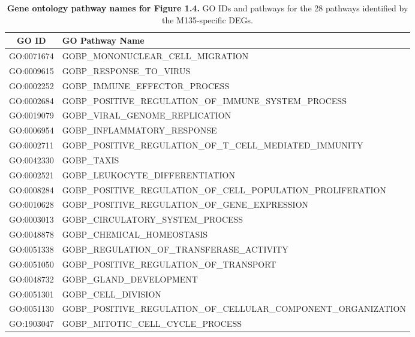 \clearpage
\begin{table}[t]
    \centering
    \caption[Gene ontology pathway names for Figure 1.4.]{\textbf{Gene ontology pathway names for Figure 1.4.} GO IDs and pathways for the 28 pathways identified by the M135-specific DEGs.}
    \begin{tabular}{|c|m{13cm}|}
    \hline
        GO ID & GO Pathway Name \\ 
        \hline
        GO:0071674 & GOBP\_MONONUCLEAR\_CELL\_MIGRATION \\ 
        \hline
        GO:0009615 & GOBP\_RESPONSE\_TO\_VIRUS \\ \hline
        GO:0002252 & GOBP\_IMMUNE\_EFFECTOR\_PROCESS \\ \hline
        GO:0002684 & GOBP\_POSITIVE\_REGULATION\_OF\_IMMUNE\_SYSTEM\_PROCESS \\ \hline
        GO:0019079 & GOBP\_VIRAL\_GENOME\_REPLICATION \\ \hline
        GO:0006954 & GOBP\_INFLAMMATORY\_RESPONSE \\ \hline
        GO:0002711 & GOBP\_POSITIVE\_REGULATION\_OF\_T\_CELL\_MEDIATED\_IMMUNITY \\ \hline
        GO:0042330 & GOBP\_TAXIS \\ \hline
        GO:0002521 & GOBP\_LEUKOCYTE\_DIFFERENTIATION \\ \hline
        GO:0008284 & GOBP\_POSITIVE\_REGULATION\_OF\_CELL\_\newline POPULATION\_PROLIFERATION \\ \hline
        GO:0010628 & GOBP\_POSITIVE\_REGULATION\_OF\_GENE\_EXPRESSION \\ \hline
        GO:0003013 & GOBP\_CIRCULATORY\_SYSTEM\_PROCESS \\ \hline
        GO:0048878 & GOBP\_CHEMICAL\_HOMEOSTASIS \\ \hline
        GO:0051338 & GOBP\_REGULATION\_OF\_TRANSFERASE\_ACTIVITY \\ \hline
        GO:0051050 & GOBP\_POSITIVE\_REGULATION\_OF\_TRANSPORT \\ \hline
        GO:0048732 & GOBP\_GLAND\_DEVELOPMENT \\ \hline
        GO:0051301 & GOBP\_CELL\_DIVISION \\ \hline
        GO:0051130 & GOBP\_POSITIVE\_REGULATION\_OF\_CELLULAR\_\newline COMPONENT\_ORGANIZATION \\ \hline
        GO:1903047 & GOBP\_MITOTIC\_CELL\_CYCLE\_PROCESS \\ \hline

\end{tabular}
\end{table}
